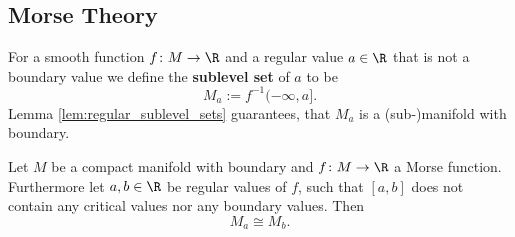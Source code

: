 \subsection{Morse Theory}

    
    For a smooth function $f \colon M \to \R$ and a regular value $a \in \R$ that is not a boundary value we define the \textbf{sublevel set} of $a$ to be
    \[
    M_a := f^{-1}(-\infty,a].
    \] 
    Lemma \ref{lem:regular_sublevel_sets} guarantees, that $M_a$ is a (sub-)manifold with boundary.

    \begin{lemma}
        \label{lem:topology_sublevel_sets_not_crossing_critical_point}
        Let $M$ be a compact manifold with boundary and $f \colon M \to \R$ a Morse function. Furthermore let $a,b \in \R$ be regular values of $f$, such that $[a,b]$ does not contain any critical values nor any boundary values. Then 
        \[
        M_a \cong M_b.
        \]
    \end{lemma}

